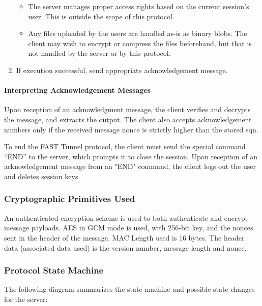 \documentclass[12pt]{article}
\begin{document}
\begin{enumerate}
\begin{itemize}
        \item The server manages proper access rights based on the current session's user. This is outside the scope of this protocol.
        \item Any files uploaded by the users are handled as-is as binary blobs. The client may wish to encrypt or compress the files beforehand, but that is not handled by the server or by this protocol.
    \end{itemize}
    \item If execution successful, send appropriate acknowledgement message.

\end{enumerate}

\paragraph{Interpreting Acknowledgement Messages}

Upon reception of an acknowledgment message, the client verifies and decrypts the message, and extracts the output. The client also accepts acknowledgement numbers only if the received message nonce is strictly higher than the stored sqn.

To end the FAST Tunnel protocol, the client must send the special command “END” to the server, which prompts it to close the session. Upon reception of an acknowledgement message from an "END" command, the client logs out the user and deletes session keys.

\subsubsection{Cryptographic Primitives Used}

An authenticated encryption scheme is used to both authenticate and encrypt message payloads. AES in GCM mode is used, with 256-bit key, and the nonces sent in the header of the message. MAC Length used is 16 bytes. The header data (associated data used) is the version number, message length and nonce.

\subsubsection{Protocol State Machine}

The following diagram summarizes the state machine and possible state changes for the server:
\end{document}
